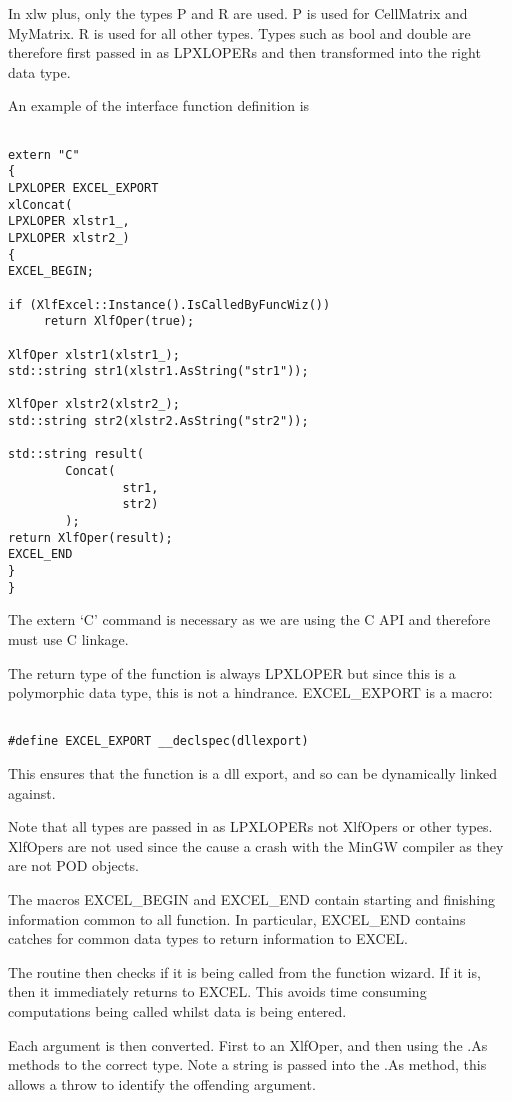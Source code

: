\documentclass[12pt,reqno]{amsart}
\numberwithin{equation}{section}
\numberwithin{figure}{section}
\begin{document}
In xlw plus, only the types P and R are used. P is used for CellMatrix
and MyMatrix. R is used for all other types. Types such as bool and
double are therefore first passed in as LPXLOPERs and then transformed
into the right data type. 

An example of the interface function definition is 

\begin{verbatim}

extern "C"
{
LPXLOPER EXCEL_EXPORT
xlConcat(
LPXLOPER xlstr1_,
LPXLOPER xlstr2_)
{
EXCEL_BEGIN;

if (XlfExcel::Instance().IsCalledByFuncWiz())
     return XlfOper(true);

XlfOper xlstr1(xlstr1_);
std::string str1(xlstr1.AsString("str1"));

XlfOper xlstr2(xlstr2_);
std::string str2(xlstr2.AsString("str2"));

std::string result(
        Concat(
                str1,
                str2)
        );
return XlfOper(result);
EXCEL_END
}
}

\end{verbatim}

The extern `C' command is necessary as we are using the C API and
therefore must use C linkage. 

The return type of the function is always LPXLOPER but since this is a
polymorphic data type, this is not a hindrance.  EXCEL\_EXPORT is a
macro:
\begin{verbatim}

#define EXCEL_EXPORT __declspec(dllexport)

\end{verbatim}
This ensures that the function is a dll export, and so can be
dynamically linked against. 

Note that all types are passed in as LPXLOPERs not XlfOpers or other
types. XlfOpers are not used since the cause a crash with the MinGW
compiler as they are not POD objects. 

The macros EXCEL\_BEGIN and EXCEL\_END contain starting and finishing
information common to all function. In particular, EXCEL\_END contains
catches for common data types to return information to EXCEL. 

The routine then checks if it is being called from the function
wizard. If it is, then it immediately returns to EXCEL. This avoids
time consuming computations being called whilst data is being
entered. 

Each argument is then converted. First to an XlfOper, and then using
the .As methods to the correct type. Note a string is passed into the
.As method, this allows a throw to identify the offending argument. 
\end{document}
